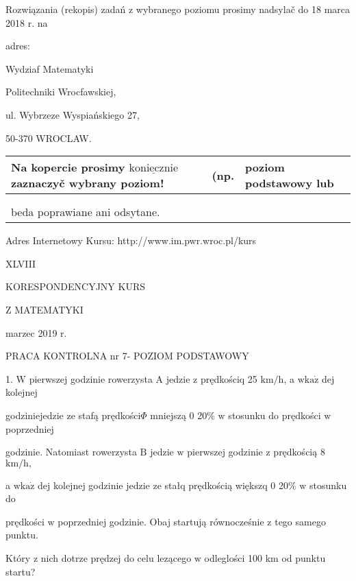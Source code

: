 \documentclass[a4paper,12pt]{article}
\begin{document}
Rozwiązania (rekopis) zadań z wybranego poziomu prosimy nadsylač do 18 marca 2018 r. na

adres:

Wydziaf Matematyki

Politechniki Wrocfawskiej,

ul. Wybrzeze Wyspiańskiego 27,

50-370 WROCLAW.
\begin{center}
\begin{tabular}{|l|l|l|}
\hline
\multicolumn{1}{|l|}{Na kopercie prosimy $\underline{\mathrm{k}\mathrm{o}\mathrm{n}\mathrm{i}\mathrm{e}\mathrm{c}\mathrm{z}\mathrm{n}\mathrm{i}\mathrm{e}}$ zaznaczyč wybrany poziom!}&	\multicolumn{1}{|l|}{(np.}&	\multicolumn{1}{|l|}{poziom podstawowy lub}	\\
\hline
	\\
	\\
\multicolumn{1}{|l|}{beda poprawiane ani odsytane.}	\\
\cline{1-1}
\end{tabular}

\end{center}
Adres Internetowy Kursu: http://www.im.pwr.wroc.pl/kurs







XLVIII

KORESPONDENCYJNY KURS

Z MATEMATYKI

marzec 2019 r.

PRACA KONTROLNA nr 7- POZIOM PODSTAWOWY

1. $\mathrm{W}$ pierwszej godzinie rowerzysta A jedzie $\mathrm{z}$ prędkościq 25 $\mathrm{k}\mathrm{m}/\mathrm{h}$, a $\mathrm{w}\mathrm{k}\mathrm{a}\dot{\mathrm{z}}$ dej kolejnej

godziniejedzie ze stafą prędkości$\Phi$ mniejszą $0$ 20\% $\mathrm{w}$ stosunku do prędkości $\mathrm{w}$ poprzedniej

godzinie. Natomiast rowerzysta $\mathrm{B}$ jedzie $\mathrm{w}$ pierwszej godzinie $\mathrm{z}$ prędkością 8 $\mathrm{k}\mathrm{m}/\mathrm{h},$

a $\mathrm{w}\mathrm{k}\mathrm{a}\dot{\mathrm{z}}$ dej kolejnej godzinie jedzie ze stałq prędkością większq $0$ 20\% $\mathrm{w}$ stosunku do

prędkości $\mathrm{w}$ poprzedniej godzinie. Obaj startują równocześnie $\mathrm{z}$ tego samego punktu.

Który $\mathrm{z}$ nich dotrze prędzej do celu lezącego $\mathrm{w}$ odleglości 100 km od punktu startu?
\end{document}
